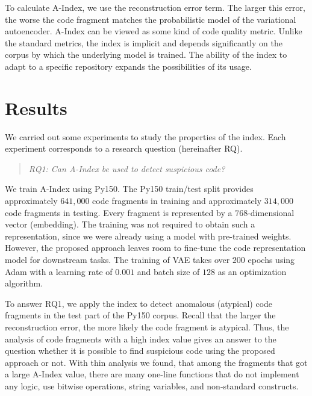 \documentclass[10pt,conference]{IEEEtran}
\begin{document}
To calculate {\sc A-Index}, we use the reconstruction error term.
The larger this error, the worse the code fragment matches the probabilistic model of the variational autoencoder.
{\sc A-Index} can be viewed as some kind of code quality metric.
Unlike the standard metrics, the index is implicit and depends significantly on the corpus by which the underlying model is trained.
The ability of the index to adapt to a specific repository expands the possibilities of its usage.


\section{Results}\label{results}

We carried out some experiments to study the properties of the index.
Each experiment corresponds to a research question (hereinafter RQ).

\bigskip


\begin{quote}\emph{RQ1: Can A-Index be used to detect suspicious code?}\end{quote}

We train {\sc A-Index} using Py150.
The Py150 train/test split provides approximately $641,000$ code fragments in training and approximately $314,000$ code fragments in testing.
Every fragment is represented by a $768$-dimensional vector (embedding).
The training was not required to obtain such a representation, since we were already using a model with pre-trained weights. 
However, the proposed approach leaves room to fine-tune the code representation model for downstream tasks.
The training of VAE takes over $200$ epochs using Adam \cite{KingmaBa2015} with a learning rate of $0.001$ 
 and batch size of $128$ as an optimization algorithm.

To answer RQ1, we apply the index to detect anomalous (atypical) code fragments in the test part of the Py150 corpus.
Recall that the larger the reconstruction error, the more likely the code fragment is atypical.
Thus, the analysis of code fragments with a high index value gives an answer to the question
 whether it is possible to find suspicious code using the proposed approach or not.
With thin analysis we found, that among the fragments that got a large {\sc A-Index} value, there are many one-line functions that do not implement any logic,
 use bitwise operations, string variables, and non-standard constructs.
\end{document}
